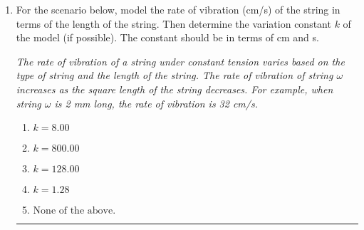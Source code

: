 \documentclass[14pt]{extbook}
\newcommand{\litem}[1]{\item#1\hspace*{-1cm}\rule{\textwidth}{0.4pt}}
\begin{document}
\begin{enumerate}
{\begin{enumerate}[label=\Alph*.]
\end{enumerate} }
\litem{
For the scenario below, model the rate of vibration (cm/s) of the string in terms of the length of the string. Then determine the variation constant $k$ of the model (if possible). The constant should be in terms of cm and s.
\begin{center}
    \textit{ The rate of vibration of a string under constant tension varies based on the type of string and the length of the string. The rate of vibration of string $\omega$ increases as the square length of the string decreases. For example, when string $\omega$ is 2 mm long, the rate of vibration is 32 cm/s. }
\end{center}
\begin{enumerate}[label=\Alph*.]
\item \( k = 8.00 \)
\item \( k = 800.00 \)
\item \( k = 128.00 \)
\item \( k = 1.28 \)
\item \( \text{None of the above.} \)

\end{enumerate} }
\end{enumerate}
\end{document}

